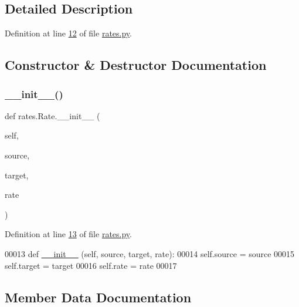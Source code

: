 \subsection{Detailed Description}


Definition at line \hyperlink{rates_8py_source_l00012}{12} of file \hyperlink{rates_8py_source}{rates.\+py}.



\subsection{Constructor \& Destructor Documentation}
\mbox{\label{classrates_1_1_rate_a935221ad61f9c683e6da812ac7f53cc3}} 
\subsubsection{\texorpdfstring{\+\_\+\+\_\+init\+\_\+\+\_\+()}{\_\_init\_\_()}}
{\footnotesize\ttfamily def rates.\+Rate.\+\_\+\+\_\+init\+\_\+\+\_\+ (\begin{DoxyParamCaption}\item[{}]{self,  }\item[{}]{source,  }\item[{}]{target,  }\item[{}]{rate }\end{DoxyParamCaption})}



Definition at line \hyperlink{rates_8py_source_l00013}{13} of file \hyperlink{rates_8py_source}{rates.\+py}.


\begin{DoxyCode}
00013     \textcolor{keyword}{def }\hyperlink{namespacestart__time_a9c9bd378729a13c96a22c8b079ea172c}{\_\_init\_\_} (self, source, target, rate): 
00014         self.source = source
00015         self.target = target
00016         self.rate   = rate        
00017         
\end{DoxyCode}


\subsection{Member Data Documentation}
\mbox{\label{classrates_1_1_rate_a5a660cfdfaa515a6e5809492525d61a7}} 
